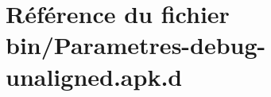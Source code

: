 \section{\-Référence du fichier bin/\-Parametres-\/debug-\/unaligned.apk.\-d}
\label{_parametres-debug-unaligned_8apk_8d}
